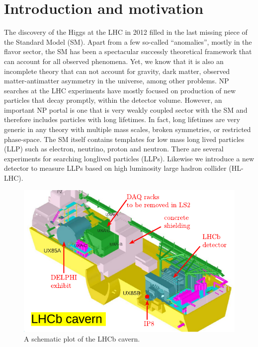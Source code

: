 \section{Introduction and motivation}
\label{sec:Introduction}



The discovery of the Higgs at the LHC in 2012 filled in the last missing piece of the Standard Model (SM). Apart from a few so-called ``anomalies'', mostly in the flavor sector, the SM has been a spectacular successly theoretical framework that can account for all observed phenomena. Yet, we know that it is also an incomplete theory that can not account for gravity, dark matter, observed matter-antimatter asymmetry in the universe, among other problems. NP searches at the LHC experiments have mostly focused on production of new particles that decay promptly, within the detector volume. However, an important NP portal is one that is very weakly coupled sector with the SM and therefore includes particles with long lifetimes. In fact, long lifetimes are very generic in any theory with multiple mass scales, broken symmetries, or restricted phase-space. The SM itself contains templates for low mass long lived particles (LLP) such as electron, neutrino, proton and neutron.
There are several experiments for searching longlived particles (LLPs). 
Likewise we introduce a new detector to measure LLPs based on high luminosity large hadron collider (HL-LHC).

\begin{figure}
\centering
    \includegraphics[width=15cm]{figs/INT/lhcb_cavern.pdf}
\caption{ 
   A schematic plot of the LHCb cavern. 
}
\end{figure}


